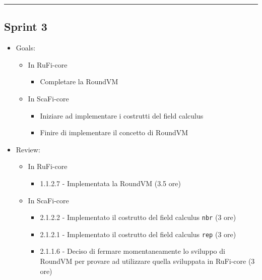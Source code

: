 \documentclass[12pt, a4paper]{article}
\begin{document}
\par\noindent\rule{\textwidth}{0.5pt}

\subsection*{Sprint 3}

\begin{itemize}
    \item Goals:
          \begin{itemize}
              \color{teal}
              \item In RuFi-core
                    \begin{itemize}
                        \item Completare la RoundVM
                    \end{itemize}
                    \color{cyan}
              \item In ScaFi-core
                    \begin{itemize}
                        \item Iniziare ad implementare i costrutti del field calculus
                        \item Finire di implementare il concetto di RoundVM
                    \end{itemize}
          \end{itemize}
    \item Review:
          \begin{itemize}
              \color{teal}
              \item In RuFi-core
                    \begin{itemize}
                        \item 1.1.2.7 - Implementata la RoundVM (3.5 ore)
                    \end{itemize}
                    \color{cyan}
              \item In ScaFi-core
                    \begin{itemize}
                        \item 2.1.2.2 - Implementato il costrutto del field calculus \texttt{nbr} (3 ore)
                        \item 2.1.2.1 - Implementato il costrutto del field calculus \texttt{rep} (3 ore)
                        \item 2.1.1.6 - Deciso di fermare momentaneamente lo sviluppo di RoundVM per provare ad utilizzare quella sviluppata in \color{teal}RuFi-core \color{cyan} (3 ore)
                    \end{itemize}
          \end{itemize}
\end{itemize}
\end{document}
